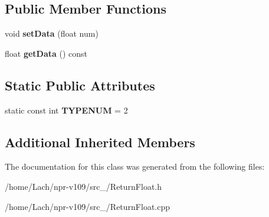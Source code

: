 \subsection*{Public Member Functions}
\begin{DoxyCompactItemize}
\item 
\hypertarget{classReturnFloat_a3d8aea3ea6e416098554dfd157cb60eb}{}\label{classReturnFloat_a3d8aea3ea6e416098554dfd157cb60eb} 
void {\bfseries set\+Data} (float num)
\item 
\hypertarget{classReturnFloat_afc9b184da42b7190b22602c3392b3d6e}{}\label{classReturnFloat_afc9b184da42b7190b22602c3392b3d6e} 
float {\bfseries get\+Data} () const
\end{DoxyCompactItemize}
\subsection*{Static Public Attributes}
\begin{DoxyCompactItemize}
\item 
\hypertarget{classReturnFloat_aba14d134e5986c2c8e706a6a6107e867}{}\label{classReturnFloat_aba14d134e5986c2c8e706a6a6107e867} 
static const int {\bfseries T\+Y\+P\+E\+N\+UM} = 2
\end{DoxyCompactItemize}
\subsection*{Additional Inherited Members}


The documentation for this class was generated from the following files\+:\begin{DoxyCompactItemize}
\item 
/home/\+Lach/npr-\/v109/src\+\_/Return\+Float.\+h\item 
/home/\+Lach/npr-\/v109/src\+\_/Return\+Float.\+cpp\end{DoxyCompactItemize}
